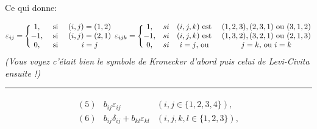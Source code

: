 \documentclass[11pt, french]{article}
\begin{document}
Ce qui donne:

\begin{equation*}
\varepsilon_{ij} = \Bigg\{
\begin{matrix}
1, & \text{ si } & (i,j) = (1,2)\\
-1,& \text{ si } & (i,j) = (2,1)\\
0, & \text{ si } & i=j
\end{matrix}\\
\varepsilon_{ijk} = \Bigg\{ 
\begin{matrix}
1, & si & (i,j,k) \text{ est } & (1,2,3), (2,3,1) \text{ ou } (3,1,2)\\
-1, & si & (i,j,k) \text{ est } & (1,3,2), (3,2,1) \text{ ou } (2,1,3)\\
0, & si & i=j \text{, ou } & j = k \text{, ou } i = k
\end{matrix}
\end{equation*}
\textit{(Vous voyez c'était bien le symbole de Kronecker d'abord puis celui de Levi-Civita ensuite !)}

\noindent\rule{\textwidth}{1pt}


\begin{align*}
\begin{matrix}
(5) & b_{ij}\varepsilon_{ij} & (i,j \in \{1, 2, 3, 4\}), \\
(6) & b_{ij}\delta_{ij} + b_{kl}\varepsilon_{kl} & (i,j,k,l \in \{1, 2, 3\}),
\end{matrix}
\end{align*}
\end{document}
